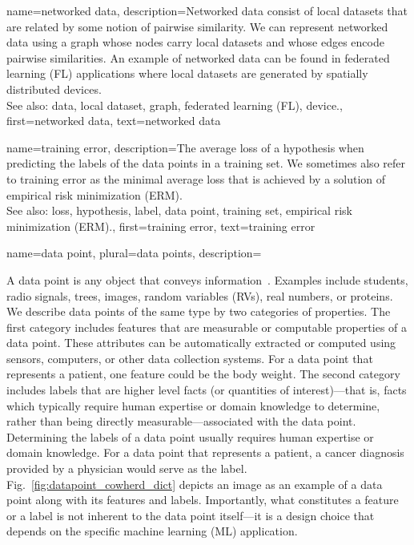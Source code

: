 {
{name={networked data},
	description={Networked data consist of local datasets 
		that are related by some notion of pairwise similarity. We can represent networked 
		data using a graph whose nodes carry local datasets and whose edges encode 
		pairwise similarities. An example of networked data can be found in federated learning (FL) applications 
		where local datasets are generated by spatially distributed devices.
			\\
		See also: data, local dataset, graph, federated learning (FL), device.}, 
	first={networked data},
	text={networked data}  
}

{name={training error},
	description={The average loss of a hypothesis when 
		predicting the labels of the data points in a training set. 
		We sometimes also refer to training error as the minimal average loss 
		that is achieved by a solution of empirical risk minimization (ERM).
				\\
		See also: loss, hypothesis, label, data point, training set, empirical risk minimization (ERM).},
	first={training error},
	text={training error}  
}

{name={data point}, plural={data points},
	description={A data point is any object that conveys information~\cite{coverthomas}. 
		Examples include students, radio signals, trees, images, random variables (RVs), real numbers, 
 		or proteins. We describe data points of the same type by two categories 
		of properties. The first category includes features that are measurable or 
		computable properties of a data point. These attributes can be automatically extracted 
		or computed using sensors, computers, or other data collection systems. For a data 
		point that represents a patient, one feature could be the body weight.
		The second category includes labels that are higher level facts (or quantities of interest)—that is, facts which typically require human expertise or domain knowledge to determine, rather than being directly measurable—associated with the data point. Determining the labels of a data point 
		usually requires human expertise or domain knowledge. For a data point that represents a patient, 
		a cancer diagnosis provided by a physician would serve as the label. 
		Fig.\ \ref{fig:datapoint_cowherd_dict} depicts an image as an example of a data 
		point along with its features and labels. Importantly, what constitutes 
		a feature or a label is not inherent to the data point itself—it is a design 
		choice that depends on the specific machine learning (ML) application.
		\begin{figure}[H]
    		\centering
    			

\end{figure}}}}
